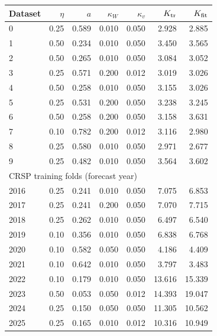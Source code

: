 \documentclass[11pt]{article}
\theoremstyle{definition}\newtheorem{definition}[theorem]{Definition}
\theoremstyle{remark}\newtheorem{remark}[theorem]{Remark}
\begin{document}
\begin{table}[htbp]\centering\small

\begin{tabular}{lrrrrrr}\toprule

Dataset & $\eta$ & $a$ & $\kappa_W$ & $\kappa_v$ & $K_{\rm tr}$ & $K_{\rm fit}$ \\ \midrule

0 & 0.25 & 0.589 & 0.010 & 0.050 & 2.928 & 2.885 \\

1 & 0.50 & 0.234 & 0.010 & 0.050 & 3.450 & 3.565 \\

2 & 0.50 & 0.265 & 0.010 & 0.050 & 3.084 & 3.052 \\

3 & 0.25 & 0.571 & 0.200 & 0.012 & 3.019 & 3.026 \\

4 & 0.50 & 0.258 & 0.010 & 0.050 & 3.155 & 3.026 \\

5 & 0.25 & 0.531 & 0.200 & 0.050 & 3.238 & 3.245 \\

6 & 0.50 & 0.258 & 0.200 & 0.050 & 3.158 & 3.631 \\

7 & 0.10 & 0.782 & 0.200 & 0.012 & 3.116 & 2.980 \\

8 & 0.25 & 0.580 & 0.010 & 0.050 & 2.971 & 2.677 \\

9 & 0.25 & 0.482 & 0.010 & 0.050 & 3.564 & 3.602 \\

\midrule\multicolumn{7}{l}{CRSP training folds (forecast year)} \\
2016 & 0.25 & 0.241 & 0.010 & 0.050 & 7.075 & 6.853 \\
2017 & 0.25 & 0.241 & 0.200 & 0.050 & 7.070 & 7.715 \\
2018 & 0.25 & 0.262 & 0.010 & 0.050 & 6.497 & 6.540 \\
2019 & 0.10 & 0.356 & 0.010 & 0.050 & 6.838 & 6.768 \\
2020 & 0.10 & 0.582 & 0.050 & 0.050 & 4.186 & 4.409 \\
2021 & 0.10 & 0.642 & 0.010 & 0.050 & 3.797 & 3.483 \\
2022 & 0.10 & 0.179 & 0.010 & 0.050 & 13.616 & 15.339 \\
2023 & 0.50 & 0.053 & 0.050 & 0.012 & 14.393 & 19.047 \\
2024 & 0.25 & 0.150 & 0.050 & 0.050 & 11.305 & 10.562 \\
2025 & 0.25 & 0.165 & 0.010 & 0.012 & 10.316 & 10.949 \\
\bottomrule\end{tabular}


\end{table}
\end{document}
